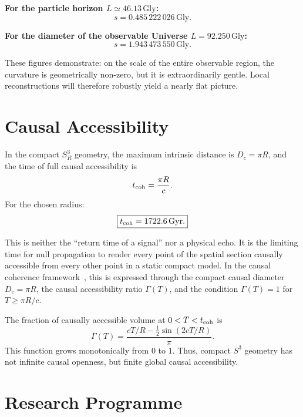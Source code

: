 \documentclass[aps,prd,onecolumn,superscriptaddress,longbibliography,nofootinbib,notitlepage]{revtex4-2}
\newcommand{\Gly}{\,\mathrm{Gly}}
\newcommand{\Gyr}{\,\mathrm{Gyr}}
\newcommand{\GammaT}{\Gamma(T)}
\begin{document}
\textbf{For the particle horizon $L \simeq 46.13\Gly$:}
\begin{equation}
  \boxed{s = 0.485\,222\,026\Gly.}
\end{equation}

\textbf{For the diameter of the observable Universe $L = 92.250\Gly$:}
\begin{equation}
  \boxed{s = 1.943\,473\,550\Gly.}
\end{equation}

These figures demonstrate: on the scale of the entire observable region, the
curvature is geometrically non-zero, but it is extraordinarily gentle. Local
reconstructions will therefore robustly yield a nearly flat picture.

\section{Causal Accessibility}
\label{sec:causal}

In the compact $S^3_R$ geometry, the maximum intrinsic distance is $D_c = \pi R$,
and the time of full causal accessibility is
\begin{equation}
  t_{\rm coh} = \frac{\pi R}{c}.
\end{equation}
For the chosen radius:
\begin{equation}
  \boxed{t_{\rm coh} = 1722.6\Gyr.}
\end{equation}

This is neither the ``return time of a signal'' nor a physical echo. It is the
limiting time for null propagation to render every point of the spatial section
causally accessible from every other point in a static compact model. In the
causal coherence framework~\cite{Preece2026causal}, this is expressed through the
compact causal diameter $D_c = \pi R$, the causal accessibility ratio $\GammaT$,
and the condition $\Gamma(T) = 1$ for $T \geq \pi R/c$.

The fraction of causally accessible volume at $0 < T < t_{\rm coh}$ is
\begin{equation}
  \GammaT = \frac{cT/R - \tfrac{1}{2}\sin(2cT/R)}{\pi}.
\end{equation}
This function grows monotonically from $0$ to $1$. Thus, compact $S^3$ geometry
has not infinite causal openness, but finite global causal accessibility.

\section{Research Programme}
\label{sec:programme}
\end{document}
